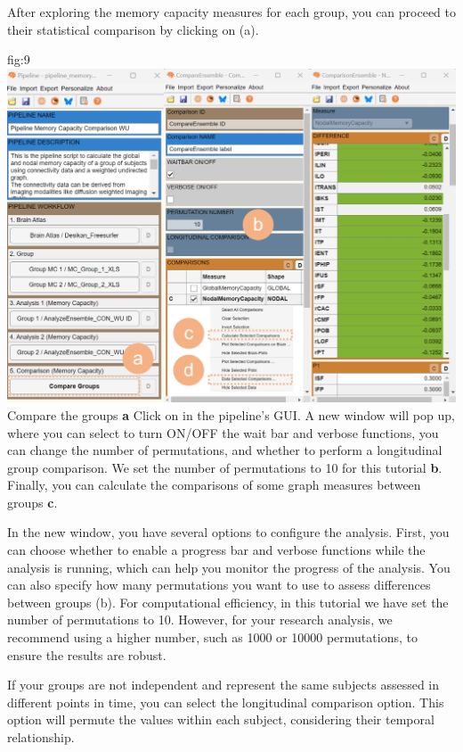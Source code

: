 \documentclass[justified]{tufte-handout}
\begin{document}
After exploring the memory capacity measures for each group, you can proceed to their statistical comparison by clicking on  (a).

{fig:9}
{
	\includegraphics{fig09.jpg}
}
{Compare the groups}
{
	{\bf a} Click on  in the pipeline's GUI. A new window will pop up, where you can select to turn ON/OFF the wait bar and verbose functions, you can change the number of permutations, and whether to perform a longitudinal group comparison. We set the number of permutations to 10 for this tutorial {\bf b}. Finally, you can calculate the comparisons of some graph measures between groups {\bf c}.
}


In the new window, you have several options to configure the analysis. First, you can choose whether to enable a progress bar and verbose functions while the analysis is running, which can help you monitor the progress of the analysis. You can also specify how many permutations you want to use to assess differences between groups (b). For computational efficiency, in this tutorial we have set the number of permutations to 10. However, for your research analysis, we recommend using a higher number, such as 1000 or 10000 permutations, to ensure the results are robust.

If your groups are not independent and represent the same subjects assessed in different points in time, you can select the longitudinal comparison option. This option will permute the values within each subject, considering their temporal relationship.
\end{document}
